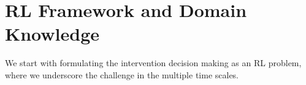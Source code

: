 \section{RL Framework and Domain Knowledge}

We start with formulating the intervention decision making as an RL problem, where we underscore the challenge in the multiple time scales.
%
%
%
